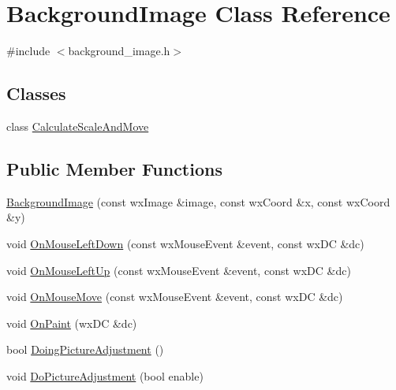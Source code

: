 \hypertarget{a00017}{\section{Background\-Image Class Reference}
\label{a00017}
}


{\ttfamily \#include $<$background\-\_\-image.\-h$>$}

\subsection*{Classes}
\begin{DoxyCompactItemize}
\item 
class \hyperlink{a00026}{Calculate\-Scale\-And\-Move}
\end{DoxyCompactItemize}
\subsection*{Public Member Functions}
\begin{DoxyCompactItemize}
\item 
\hyperlink{a00017_a29939f6b581d864b8bca97063890c0ae}{Background\-Image} (const wx\-Image \&image, const wx\-Coord \&x, const wx\-Coord \&y)
\item 
void \hyperlink{a00017_a581572e942b22b6f035738644936f7e8}{On\-Mouse\-Left\-Down} (const wx\-Mouse\-Event \&event, const wx\-D\-C \&dc)
\item 
void \hyperlink{a00017_a1aaca3506e3303df61daaddbaac43017}{On\-Mouse\-Left\-Up} (const wx\-Mouse\-Event \&event, const wx\-D\-C \&dc)
\item 
void \hyperlink{a00017_afc127d8e4bdcd37f6bb62116a32a7ecb}{On\-Mouse\-Move} (const wx\-Mouse\-Event \&event, const wx\-D\-C \&dc)
\item 
void \hyperlink{a00017_a4ab0518bd790d9b00ff1f7e777e2cca2}{On\-Paint} (wx\-D\-C \&dc)
\item 
bool \hyperlink{a00017_a0c4359024d9144013cdc81cbbd9fb2f9}{Doing\-Picture\-Adjustment} ()
\item 
void \hyperlink{a00017_a3c736dc98d1a9f5238fd51e2b0316744}{Do\-Picture\-Adjustment} (bool enable)
\end{DoxyCompactItemize}
